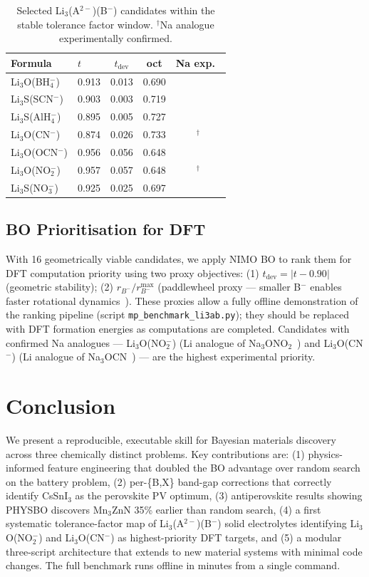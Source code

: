 \documentclass[10pt,twocolumn]{article}
\begin{document}
\begin{table}[h]
\centering
\caption{Selected Li$_3$(A$^{2-}$)(B$^-$) candidates within the stable tolerance
factor window. $^\dagger$Na analogue experimentally confirmed.}
\label{tab:li3ab}
\begin{tabular}{llccc}
\toprule
Formula & $t$ & $t_{\text{dev}}$ & oct & Na exp.\ \\
\midrule
Li$_3$O(BH$_4^-$)  & 0.913 & 0.013 & 0.690 & \\
Li$_3$S(SCN$^-$)   & 0.903 & 0.003 & 0.719 & \\
Li$_3$S(AlH$_4^-$) & 0.895 & 0.005 & 0.727 & \\
Li$_3$O(CN$^-$)    & 0.874 & 0.026 & 0.733 & $^\dagger$ \\
Li$_3$O(OCN$^-$)   & 0.956 & 0.056 & 0.648 & \\
Li$_3$O(NO$_2^-$)  & 0.957 & 0.057 & 0.648 & $^\dagger$ \\
Li$_3$S(NO$_3^-$)  & 0.925 & 0.025 & 0.697 & \\
\bottomrule
\end{tabular}
\end{table}

\subsection{BO Prioritisation for DFT}

With 16 geometrically viable candidates, we apply NIMO BO to rank them for
DFT computation priority using two proxy objectives:
(1) $t_{\text{dev}} = |t - 0.90|$ (geometric stability);
(2) $r_{B^-}/r_{B^-}^{\max}$ (paddlewheel proxy --- smaller B$^-$ enables faster
rotational dynamics~\cite{gao2020}).
These proxies allow a fully offline demonstration of the ranking pipeline
(script \texttt{mp\_benchmark\_li3ab.py}); they should be replaced with DFT
formation energies as computations are completed.
Candidates with confirmed Na analogues --- Li$_3$O(NO$_2^-$) (Li analogue of
Na$_3$ONO$_2$~\cite{gao2020}) and Li$_3$O(CN$^-$) (Li analogue of
Na$_3$OCN~\cite{jansen1991}) --- are the highest experimental priority.

\section{Conclusion}

We present a reproducible, executable skill for Bayesian materials discovery
across three chemically distinct problems.
Key contributions are: (1) physics-informed feature engineering that doubled
the BO advantage over random search on the battery problem, (2) per-\{B,X\}
band-gap corrections that correctly identify CsSnI$_3$ as the perovskite PV
optimum, (3) antiperovskite results showing PHYSBO discovers Mn$_3$ZnN 35\%
earlier than random search, (4) a first systematic tolerance-factor map of
Li$_3$(A$^{2-}$)(B$^-$) solid electrolytes identifying Li$_3$O(NO$_2^-$) and
Li$_3$O(CN$^-$) as highest-priority DFT targets, and (5) a modular three-script
architecture that extends to new material systems with minimal code changes.
The full benchmark runs offline in minutes from a single command.
\end{document}
